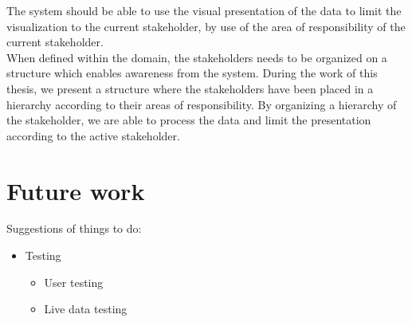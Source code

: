 The system should be able to use the visual presentation of the data to limit
the visualization to the current stakeholder, by use of the area of
responsibility of the current stakeholder.\\


When defined within the domain, the stakeholders needs to be organized on a 
structure which enables awareness from the system. During the work of this 
thesis, we present a structure where the stakeholders have been placed in a 
hierarchy according to their areas of responsibility. By organizing a 
hierarchy of the stakeholder, we are able to process the data and limit the 
presentation according to the active stakeholder. 

\section{Future work} %
\label{sec:future_work}

Suggestions of things to do:
\begin{itemize}
	\item Testing
	\begin{itemize}
		\item User testing
		\item Live data testing
	\end{itemize}
\end{itemize}

%

